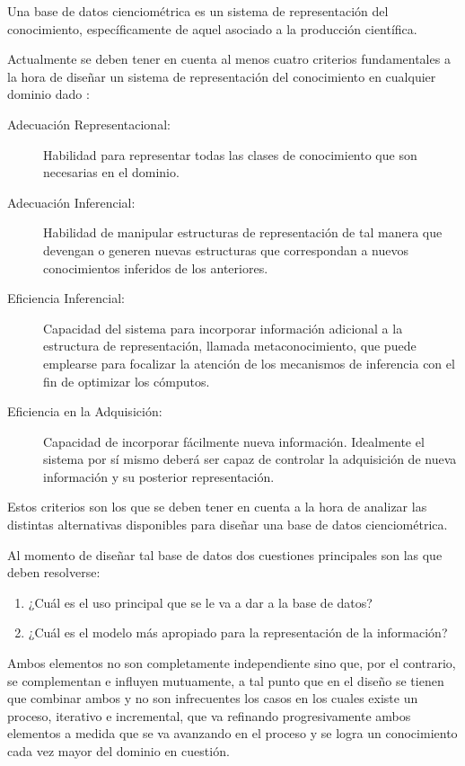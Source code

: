 Una base de datos cienciométrica es un sistema de representación del conocimiento, específicamente de aquel asociado a la producción científica.

Actualmente se deben tener en cuenta al menos cuatro criterios fundamentales a la hora de diseñar un sistema de representación del conocimiento en cualquier dominio dado \cite{van2008handbook}:

\begin{description}
	\item [Adecuación Representacional:] Habilidad para representar todas las clases de conocimiento que son necesarias en el dominio.
	\item [Adecuación Inferencial:] Habilidad de manipular estructuras de representación de tal manera que devengan o generen nuevas estructuras que correspondan a nuevos conocimientos inferidos de los anteriores.
	\item [Eficiencia Inferencial:] Capacidad del sistema para incorporar información adicional a la estructura de representación, llamada metaconocimiento, que puede emplearse para focalizar la atención de los mecanismos de inferencia con el fin de optimizar los cómputos.
	\item [Eficiencia en la Adquisición:] Capacidad de incorporar fácilmente nueva información. Idealmente el sistema por sí mismo deberá ser capaz de controlar la adquisición de nueva información y su posterior representación.
\end{description}

Estos criterios son los que se deben tener en cuenta a la hora de analizar las distintas alternativas disponibles para diseñar una base de datos cienciométrica.

Al momento de diseñar tal base de datos dos cuestiones principales son las que deben resolverse:

\begin{enumerate}
	\item ¿Cuál es el uso principal que se le va a dar a la base de datos?
	\item ¿Cuál es el modelo más apropiado para la representación de la información?
\end{enumerate}

Ambos elementos no son completamente independiente sino que, por el contrario, se complementan e influyen mutuamente, a tal punto que en el diseño se tienen que combinar ambos y no son infrecuentes los casos en los cuales existe un proceso, iterativo e incremental, que va refinando progresivamente ambos elementos a medida que se va avanzando en el proceso y se logra un conocimiento cada vez mayor del dominio en cuestión.

